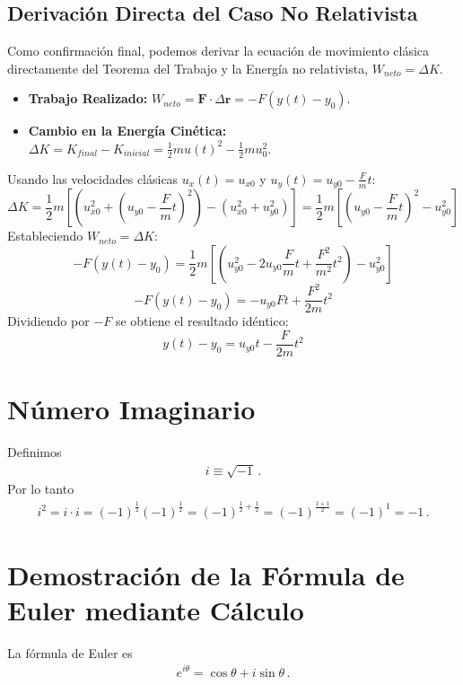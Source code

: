 \documentclass[11pt,a4paper]{article}
\begin{document}
\subsection{Derivación Directa del Caso No Relativista}
Como confirmación final, podemos derivar la ecuación de movimiento clásica directamente del Teorema del Trabajo y la Energía no relativista, $W_{neto} = \Delta K$.
\begin{itemize}
    \item \textbf{Trabajo Realizado:} $W_{neto} = \boldsymbol{F} \cdot \Delta\boldsymbol{r} = -F(y(t) - y_0)$.
    \item \textbf{Cambio en la Energía Cinética:} $\Delta K = K_{final} - K_{inicial} = \frac{1}{2}mu(t)^2 - \frac{1}{2}mu_0^2$.
\end{itemize}
Usando las velocidades clásicas $u_x(t) = u_{x0}$ y $u_y(t) = u_{y0} - \frac{F}{m}t$:
\[ \Delta K = \frac{1}{2}m\left[ (u_{x0}^2 + (u_{y0}-\frac{F}{m}t)^2) - (u_{x0}^2+u_{y0}^2) \right] = \frac{1}{2}m\left[ (u_{y0}-\frac{F}{m}t)^2 - u_{y0}^2 \right] \]
Estableciendo $W_{neto} = \Delta K$:
\[ -F(y(t)-y_0) = \frac{1}{2}m\left[ (u_{y0}^2 - 2u_{y0}\frac{F}{m}t + \frac{F^2}{m^2}t^2) - u_{y0}^2 \right] \]
\[ -F(y(t)-y_0) = -u_{y0}Ft + \frac{F^2}{2m}t^2 \]
Dividiendo por $-F$ se obtiene el resultado idéntico:
\[ y(t) - y_0 = u_{y0}t - \frac{F}{2m}t^2 \]



\appendix
\section{Número Imaginario}
Definimos
\begin{align}
    i \equiv \sqrt{-1}\,.
\end{align}
Por lo tanto
\begin{align}
    i^2 = i\cdot i = (-1)^{\frac{1}{2}}(-1)^{\frac{1}{2}}=(-1)^{\frac{1}{2}+\frac{1}{2}}
    =(-1)^{\frac{1+1}{2}}= (-1)^1 = -1\,.
\end{align}
\section{Demostración de la Fórmula de Euler mediante Cálculo}
La fórmula de Euler es
    \begin{align*}
        e^{i\theta} = \cos\theta + i\sin\theta\,.
    \end{align*}
\end{document}
